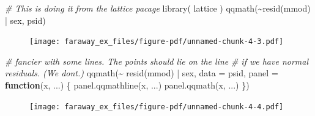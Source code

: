 \documentclass[
  letterpaper,
  DIV=11,
  numbers=noendperiod]{scrreprt}
\newenvironment{Shaded}{\begin{snugshade}}{\end{snugshade}}
\newcommand{\AttributeTok}[1]{\textcolor[rgb]{0.49,0.56,0.16}{#1}}
\newcommand{\CommentTok}[1]{\textcolor[rgb]{0.38,0.63,0.69}{\textit{#1}}}
\newcommand{\ControlFlowTok}[1]{\textcolor[rgb]{0.00,0.44,0.13}{\textbf{#1}}}
\newcommand{\DecValTok}[1]{\textcolor[rgb]{0.25,0.63,0.44}{#1}}
\newcommand{\FloatTok}[1]{\textcolor[rgb]{0.25,0.63,0.44}{#1}}
\newcommand{\FunctionTok}[1]{\textcolor[rgb]{0.02,0.16,0.49}{#1}}
\newcommand{\NormalTok}[1]{\textcolor[rgb]{0.00,0.44,0.13}{#1}}
\newcommand{\OtherTok}[1]{\textcolor[rgb]{0.00,0.44,0.13}{#1}}
\newcommand{\SpecialCharTok}[1]{\textcolor[rgb]{0.25,0.44,0.63}{#1}}
\newcommand{\StringTok}[1]{\textcolor[rgb]{0.25,0.44,0.63}{#1}}
\begin{document}
\begin{Shaded}
\begin{Highlighting}[]
\CommentTok{\# This is doing it from the lattice pacage}
\FunctionTok{library}\NormalTok{( lattice )}
\FunctionTok{qqmath}\NormalTok{(}\SpecialCharTok{\textasciitilde{}}\FunctionTok{resid}\NormalTok{(mmod) }\SpecialCharTok{|}\NormalTok{ sex, psid)}
\end{Highlighting}
\end{Shaded}

\begin{figure}[H]

{\centering \texttt{[image: faraway\_ex\_files/figure-pdf/unnamed-chunk-4-3.pdf]}

}

\end{figure}

\begin{Shaded}
\begin{Highlighting}[]
\CommentTok{\# fancier with some lines.  The points should lie on the line}
\CommentTok{\# if we have normal residuals.  (We don\textquotesingle{}t.)}
\FunctionTok{qqmath}\NormalTok{(}\SpecialCharTok{\textasciitilde{}} \FunctionTok{resid}\NormalTok{(mmod)  }\SpecialCharTok{|}\NormalTok{ sex, }\AttributeTok{data =}\NormalTok{ psid,}
       \AttributeTok{panel =} \ControlFlowTok{function}\NormalTok{(x, ...) \{}
           \FunctionTok{panel.qqmathline}\NormalTok{(x, ...)}
           \FunctionTok{panel.qqmath}\NormalTok{(x, ...)}
\NormalTok{       \})}
\end{Highlighting}
\end{Shaded}

\begin{figure}[H]

{\centering \texttt{[image: faraway\_ex\_files/figure-pdf/unnamed-chunk-4-4.pdf]}

}

\end{figure}

\begin{Shaded}
\end{Shaded}
\end{document}
